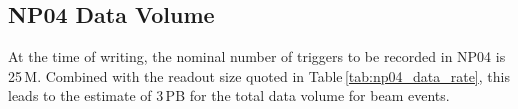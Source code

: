 \documentclass[12pt]{article}
\begin{document}

\subsection{NP04 Data Volume}

At the time of writing, the nominal number of triggers to be recorded in NP04 is 25\,M.
Combined with the readout size quoted in Table\,\ref{tab:np04_data_rate}, this leads to
the estimate of 3\,PB for the total data volume for beam events.
\end{document}
